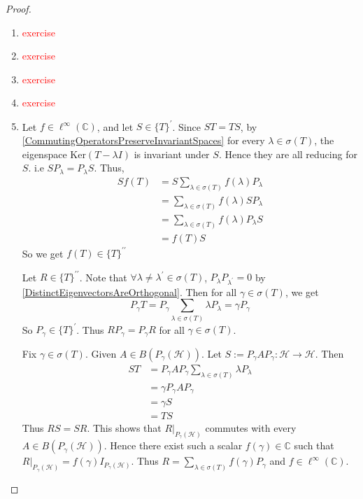 \begin{proof}
  \begin{enumerate}[label=(\arabic*)]
    \item \textcolor{red}{exercise}
    \item \textcolor{red}{exercise}
    \item \textcolor{red}{exercise}
    \item \textcolor{red}{exercise}
    \item Let $f \in \ell^\infty(\mathbb{C})$, and let $S \in
      \{T\}^\prime$. Since $ ST = TS$, by
      \autoref{CommutingOperatorsPreserveInvariantSpaces} for every $
      \lambda \in \sigma(T)$, the eigenspace $\textrm{Ker}(T - \lambda I)$ is
      invariant under $S$. Hence they are all reducing for $S$. i.e
      $SP_\lambda = P_\lambda S$. Thus,
      \begin{align*}
        Sf(T) &= S \sum_{\lambda \in  \sigma(T)}  f(\lambda)   P_\lambda \\
        &= \sum_{\lambda \in  \sigma(T)} f( \lambda) S P_\lambda \\
        &= \sum_{\lambda \in  \sigma(T)} f(  \lambda) P_\lambda  S \\
        &= f(T) S
      \end{align*}
      So we get $f(T) \in \{ T \}^{\prime \prime}$

      Let $ R \in \{ T \}^{\prime\prime}$. Note that $\forall \lambda \neq
      \lambda^\prime \in \sigma(T)$, $P_\lambda P_{\lambda^\prime} = 0$ by
      \autoref{DistinctEigenvectorsAreOrthogonal}. Then for all $\gamma \in
      \sigma(T)$, we get $$P_\gamma T = P_\gamma \sum_{\lambda \in
      \sigma(T)}  \lambda P_\lambda  = \gamma P_\gamma$$
      So $P_\gamma \in \{ T \}^\prime$. Thus $RP_\gamma = P_\gamma R$ for
      all $ \gamma \in \sigma(T)$.

      Fix $\gamma \in \sigma(T)$. Given $A \in
      B(P_\gamma(\mathcal{H}))$. Let $    S:= P_\gamma A P_\gamma :
      \mathcal{H} \to \mathcal{H}$. Then
      \begin{align*}
        ST &= P_\gamma AP_\gamma \sum_{\lambda \in  \sigma(T)}
        \lambda P_\lambda \\
        &= \gamma P_\gamma AP_\gamma \\
        &= \gamma S \\
        &= TS
      \end{align*}
      Thus $RS = SR$. This shows that $R|_{P_\gamma(\mathcal{H})}$
      commutes with every $A \in B(P_\gamma(\mathcal{H}))$. Hence
      there exist such a scalar $    f(\gamma) \in \mathbb{C}$ such
      that $R|_{P_\gamma(\mathcal{H})} = f(\gamma) I_{
      P_\gamma(\mathcal{H})}$. Thus $R = \sum_{\lambda \in
      \sigma(T)}  f(\gamma) P_\gamma$ and $ f \in \ell^\infty(\mathbb{C})$.
  \end{enumerate}


\end{proof}

